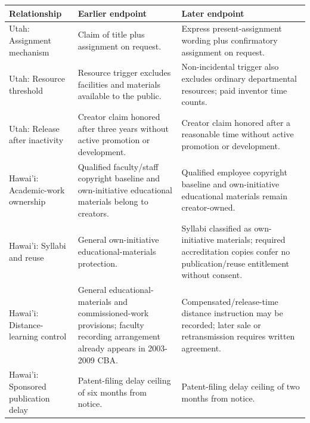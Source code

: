 \begin{tabularx}{\linewidth}{@{}>{\raggedright\arraybackslash}p{.23\linewidth}>{\raggedright\arraybackslash}X>{\raggedright\arraybackslash}X@{}}
\toprule
Relationship & Earlier endpoint & Later endpoint \\
\midrule
Utah: Assignment mechanism & Claim of title plus assignment on request. & Express present-assignment wording plus confirmatory assignment on request. \\
Utah: Resource threshold & Resource trigger excludes facilities and materials available to the public. & Non-incidental trigger also excludes ordinary departmental resources; paid inventor time counts. \\
Utah: Release after inactivity & Creator claim honored after three years without active promotion or development. & Creator claim honored after a reasonable time without active promotion or development. \\
Hawai'i: Academic-work ownership & Qualified faculty/staff copyright baseline and own-initiative educational materials belong to creators. & Qualified employee copyright baseline and own-initiative educational materials remain creator-owned. \\
Hawai'i: Syllabi and reuse & General own-initiative educational-materials protection. & Syllabi classified as own-initiative materials; required accreditation copies confer no publication/reuse entitlement without consent. \\
Hawai'i: Distance-learning control & General educational-materials and commissioned-work provisions; faculty recording arrangement already appears in 2003-2009 CBA. & Compensated/release-time distance instruction may be recorded; later sale or retransmission requires written agreement. \\
Hawai'i: Sponsored publication delay & Patent-filing delay ceiling of six months from notice. & Patent-filing delay ceiling of two months from notice. \\
\bottomrule
\end{tabularx}
